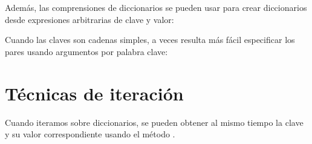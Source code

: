 \documentclass[a5paper,10pt,spanish]{sphinxmanual}
\begin{document}
\sphinxAtStartPar
Además, las comprensiones de diccionarios se pueden usar para crear diccionarios desde expresiones arbitrarias de clave y valor:

\begin{sphinxVerbatim}[commandchars=\\\{\}]
       
\end{sphinxVerbatim}

\sphinxAtStartPar
Cuando las claves son cadenas simples, a veces resulta más fácil especificar los pares usando argumentos por palabra clave:

\begin{sphinxVerbatim}[commandchars=\\\{\}]
  
\end{sphinxVerbatim}


\section{Técnicas de iteración}
\label{\detokenize{tutorial/datastructures:looping-techniques}}\label{\detokenize{tutorial/datastructures:tut-loopidioms}}
\sphinxAtStartPar
Cuando iteramos sobre diccionarios, se pueden obtener al mismo tiempo la clave y su valor correspondiente usando el método .

\begin{sphinxVerbatim}[commandchars=\\\{\}]
     
    
     
\end{sphinxVerbatim}
\end{document}
